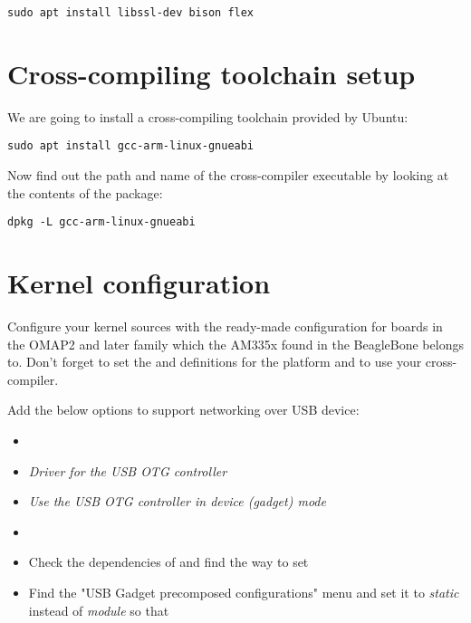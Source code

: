 \begin{verbatim}
sudo apt install libssl-dev bison flex
\end{verbatim}

\section{Cross-compiling toolchain setup}

We are going to install a cross-compiling toolchain provided by Ubuntu:

\begin{verbatim}
sudo apt install gcc-arm-linux-gnueabi
\end{verbatim}

Now find out the path and name of the cross-compiler executable by looking at the contents of the package:

\begin{verbatim}
dpkg -L gcc-arm-linux-gnueabi
\end{verbatim}

\section{Kernel configuration}

Configure your kernel sources with the ready-made configuration for boards in
the OMAP2 and later family which the AM335x found in the BeagleBone
belongs to. Don't forget to set the  and
 definitions for the  platform and to
use your cross-compiler.

Add the below options to support networking over USB device:
\begin{itemize}
  \item {}
  \item {} {\em Driver for the USB OTG
        controller}
  \item {} {\em Use the USB OTG controller
	in device (gadget) mode}
  \item {}
  \item Check the dependencies of 
        and find the way to set 
  \item Find the "USB Gadget precomposed configurations" menu
        and set it to {\em static} instead of {\em module}
	so that 
\end{itemize}

